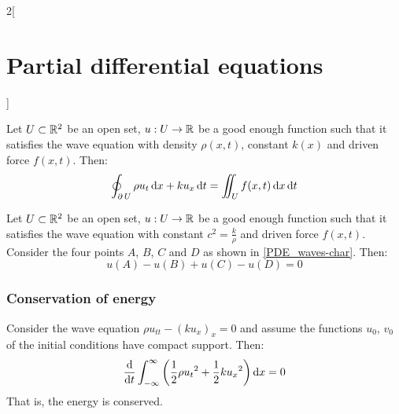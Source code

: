 \documentclass[../../../main_math.tex]{subfiles}
\begin{document}
\begin{multicols}{2}[\section{Partial differential equations}]
\begin{theorem}
  \end{theorem}
  \begin{theorem}
    Let $U\subset\mathbb{R}^2$ be an open set, $u:U\rightarrow\mathbb{R}$ be a good enough function such that it satisfies the wave equation with density $\rho(x,t)$, constant $k(x)$ and driven force $f(x,t)$. Then:
    $$\oint_{\operatorname{\partial}{U}}\rho u_t\dd{x}+k u_x\dd{t}=\iint_Uf(x,t)\dd{x}\dd{t}$$
  \end{theorem}
  \begin{proposition}
    Let $U\subset\mathbb{R}^2$ be an open set, $u:U\rightarrow\mathbb{R}$ be a good enough function such that it satisfies the wave equation with constant $c^2=\frac{k}{\rho}$ and driven force $f(x,t)$. Consider the four points $A$, $B$, $C$ and $D$ as shown in \cref{PDE_waves-char}. Then: $$u(A)-u(B)+u(C)-u(D)=0$$
    \begin{center}
      \begin{minipage}{\linewidth}
        \centering
        
        \label{PDE_waves-char}
      \end{minipage}
    \end{center}
  \end{proposition}
  \subsubsection{Conservation of energy}
  \begin{proposition}
    Consider the wave equation $\rho u_{tt}-{(ku_x)}_x=0$ and assume the functions $u_0$, $v_0$ of the initial conditions have compact support. Then: $$\dv{}{t}\int_{-\infty}^\infty\left(\frac{1}{2}\rho{u_t}^2+\frac{1}{2}k{u_x}^2\right)\dd{x}=0$$ That is, the energy is conserved.
  \end{proposition}
\end{multicols}
\end{document}
